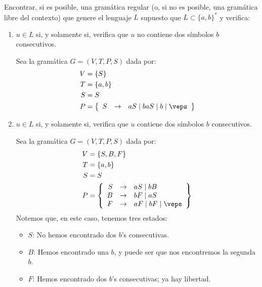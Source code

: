 \begin{ejercicio}
    Encontrar, si es posible, una gramática regular (o, si no es posible, una gramática libre del contexto) que genere el lenguaje $L$ supuesto que $L \subset \{a, b\}^\ast$ y verifica:
    \begin{enumerate}
        \item $u \in L$ si, y solamente si, verifica que $u$ no contiene dos símbolos $b$ consecutivos.
        
        Sea la gramática $G=\left(V,T,P,S\right)$ dada por:
        \begin{align*}
            V &= \{S\} \\
            T &= \{a,b\} \\
            S &= S \\
            P &= \left\{
                \begin{array}{rcl}
                    S &\rightarrow & aS \mid baS \mid b\mid \veps
                \end{array}
            \right\}
        \end{align*}
        \item $u \in L$ si, y solamente si, verifica que $u$ contiene dos símbolos $b$ consecutivos.
        
        Sea la gramática $G=\left(V,T,P,S\right)$ dada por:
        \begin{align*}
            V &= \{S, B, F\} \\
            T &= \{a,b\} \\
            S &= S \\
            P &= \left\{
                \begin{array}{rcl}
                    S &\rightarrow & aS \mid bB \\
                    B &\rightarrow & bF \mid aS \\
                    F &\rightarrow & aF \mid bF \mid \veps
                \end{array}
            \right\}
        \end{align*}
        Notemos que, en este caso, tenemos tres estados:
        \begin{itemize}
            \item $S$: No hemos encontrado dos $b$'s consecutivas.
            \item $B$: Hemos encontrado una $b$, y puede ser que nos encontremos la segunda $b$.
            \item $F$: Hemos encontrado dos $b$'s consecutivas; ya hay libertad.
        \end{itemize}


\end{enumerate}
\end{ejercicio}
